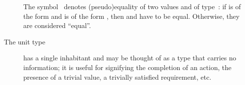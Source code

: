 \begin{description}
The symbol~\AgdaDatatype{\sim} denotes (pseudo)equality of two values  and
 of type~\AgdaSpace{}: if
 is of the form
\AgdaSpace{} and  is
of the form \AgdaSpace{}, then
 and  have to be equal. Otherwise, they are
considered ``equal''.
\item[The unit type]  has a single inhabitant  and may be thought
of as a type that carries no information; it is useful for signifying the completion of an action, the
presence of a trivial value, a trivially satisfied requirement, etc.
\end{description}
